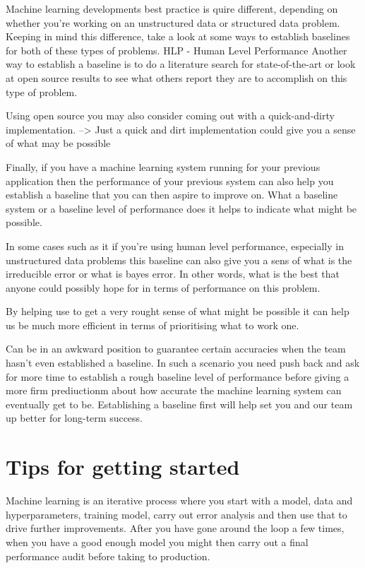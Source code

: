 Machine learning developments best practice is quire different, depending on whether you're working on an unstructured data or structured data problem.
Keeping in mind this difference, take a look at some ways to establish baselines for both of these types of problems.
HLP - Human Level Performance
Another way to establish a baseline is to do a literature search for state-of-the-art or look at open source results to see what others report they are to accomplish on this type of problem.

Using open source you may also consider coming out with a quick-and-dirty implementation.
--> Just a quick and dirt implementation could give you a sense of what may be possible

Finally, if you have a machine learning system running for your previous application then the performance of your previous system can also help you establish a baseline that you can then aspire to improve on.
What a baseline system or a baseline level of performance does it helps to indicate what might be possible.

In some cases such as it if you're using human level performance, especially in unstructured data problems this baseline can also give you a sens of what is the irreducible error or what is bayes error.
In other words, what is the best that anyone could possibly hope for in terms of performance on this problem.

By helping use to get a very rought sense of what might be possible it can help us be much more efficient in terms of  prioritising what to work one.

Can be in an awkward position to guarantee certain accuracies when the team hasn't even established a baseline.
In such a scenario you need push back  and ask for more time to establish a rough baseline level of performance before giving a more firm prediuctionm about how accurate the machine learning system can eventually get to be.
Establishing a baseline first will help set you and our team up better for long-term success.

\section{Tips for getting started}

Machine learning is an iterative process where you start with a model, data and hyperparameters, training model, carry out error analysis and then use that to drive further improvements.
After you have gone around the loop a few times, when you have a good enough model you might then carry out a final performance audit before taking to production.


